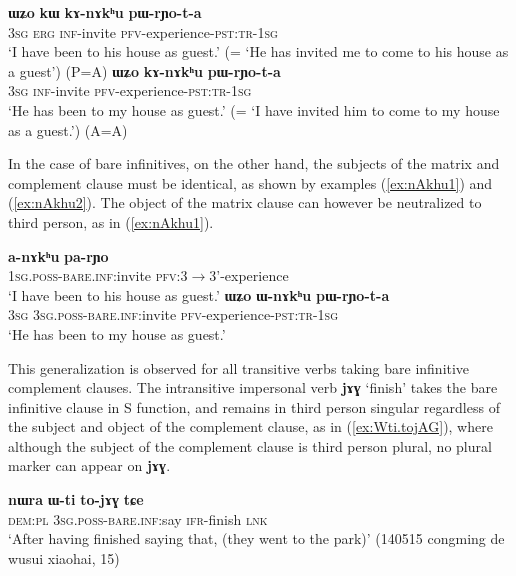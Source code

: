 \documentclass[oneside,a4paper,11pt]{article}
\newcommand{\ipa}[1]{\textbf{\phon#1}} %
\newcommand{\jpg}[2]{\ipa{#1} `#2'} %
\begin{document}
\begin{exe}
\ex  \label{ex:kAnAkhu1}
\gll
\ipa{ɯʑo} 	\ipa{kɯ} 	\ipa{kɤ-nɤkʰu} 	\ipa{pɯ-rɲo-t-a} \\
\textsc{3sg} \textsc{erg} \textsc{inf}-invite \textsc{pfv}-experience-\textsc{pst:tr-1sg} \\
\glt `I have been to his house as guest.'  (= `He has invited me to come to his house as a guest') (P=A)
\ex  \label{ex:kAnAkhu2}
\gll
\ipa{ɯʑo} 	\ipa{kɤ-nɤkʰu} 	\ipa{pɯ-rɲo-t-a} \\
\textsc{3sg}  \textsc{inf}-invite \textsc{pfv}-experience-\textsc{pst:tr-1sg} \\
\glt `He has been to my house as guest.' (= `I have invited him to come to my house as a guest.') (A=A)
\end{exe}

In the case of bare infinitives, on the other hand, the subjects of the matrix and complement clause must be identical, as shown by examples (\ref{ex:nAkhu1}) and (\ref{ex:nAkhu2}). The object of the matrix clause can however be neutralized to third person, as in (\ref{ex:nAkhu1}).

\begin{exe}
\ex  \label{ex:nAkhu1}
\gll \ipa{a-nɤkʰu} 	\ipa{pa-rɲo} \\
\textsc{1sg.poss-bare.inf:}invite \textsc{pfv:3$\rightarrow$3'}-experience \\
\glt `I have been to his house as guest.' 
\ex  \label{ex:nAkhu2}
\gll \ipa{ɯʑo} 	\ipa{ɯ-nɤkʰu} 	\ipa{pɯ-rɲo-t-a} \\
\textsc{3sg}  \textsc{3sg.poss-bare.inf:}invite \textsc{pfv}-experience-\textsc{pst:tr-1sg} \\
\glt `He has been to my house as guest.'
\end{exe}

This generalization is observed for all transitive verbs taking bare infinitive complement clauses. The intransitive impersonal verb \jpg{jɤɣ}{finish} takes the bare infinitive clause in S function, and remains in third person singular regardless of the subject and object of the complement clause, as in (\ref{ex:Wti.tojAG}), where although the subject of the complement clause is third person plural, no plural marker can appear on \ipa{jɤɣ}.

\begin{exe}
\ex \label{ex:Wti.tojAG}
\gll \ipa{nɯra} 	\ipa{ɯ-ti} 	\ipa{to-jɤɣ} \ipa{tɕe} \\
\textsc{dem:pl} \textsc{3sg.poss-bare.inf}:say \textsc{ifr}-finish \textsc{lnk}\\
\glt `After having finished saying that, (they went to the park)' (140515 congming de wusui xiaohai, 15)
\end{exe}
\end{document}
